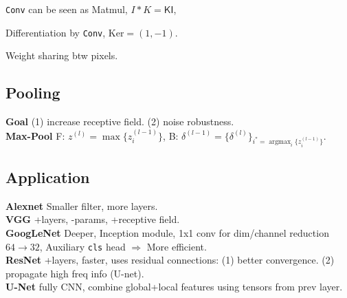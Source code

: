 \verb|Conv| can be seen as Matmul, \(I * K = \mathsf{K I}\),

Differentiation by \verb|Conv|, \(\text{Ker} = (1, -1)\).

Weight sharing btw pixels.

\subsection*{Pooling}
\textbf{Goal} (1) increase receptive field. (2) noise robustness. \\
\textbf{Max-Pool} \textsf{F}: \(z^{(l)}=\max \{z_{i}^{(l-1)}\}\), \textsf{B}: \(\delta^{(l-1)}=\{\delta^{(l)}\}_{i^{*}=\operatorname{argmax}_{i}\{z_{i}^{(l-1)}\}}\).

\subsection*{Application}
\textbf{Alexnet} Smaller filter, more layers. \\
\textbf{VGG} +layers, -params, +receptive field. \\
\textbf{GoogLeNet} Deeper, Inception module, 1x1 conv for dim/channel reduction\(64\to 32\), Auxiliary \verb|cls| head \(\Rightarrow\) More efficient. \\
\textbf{ResNet} +layers, faster, uses residual connections: (1) better convergence. (2) propagate high freq info (U-net).\\
\textbf{U-Net} fully CNN, combine global+local features using tensors from prev layer.

